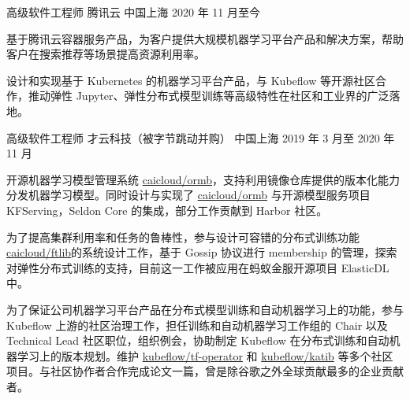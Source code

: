 

\begin{cventries}

  \cventry
    {高级软件工程师} %
    {腾讯云} %
    {中国上海} %
    {2020 年 11 月至今} %
    {
      \begin{cvitems}
        \item 基于腾讯云容器服务产品，为客户提供大规模机器学习平台产品和解决方案，帮助客户在搜索推荐等场景提高资源利用率。
        \item 设计和实现基于 Kubernetes 的机器学习平台产品，与 Kubeflow 等开源社区合作，推动弹性 Jupyter、弹性分布式模型训练等高级特性在社区和工业界的广泛落地。
      \end{cvitems}
    }

  \cventry
    {高级软件工程师} %
    {才云科技（被字节跳动并购）} %
    {中国上海} %
    {2019 年 3 月至 2020 年 11 月} %
    {
      \begin{cvitems} %
        \item 开源机器学习模型管理系统 \href{https://github.com/caicloud/ormb}{caicloud/ormb}，支持利用镜像仓库提供的版本化能力分发机器学习模型。同时设计与实现了 \href{https://github.com/caicloud/ormb}{caicloud/ormb} 与开源模型服务项目 KFServing，Seldon Core 的集成，部分工作贡献到 Harbor 社区。
        \item 为了提高集群利用率和任务的鲁棒性，参与设计可容错的分布式训练功能 \href{https://github.com/caicloud/ftlib}{caicloud/ftlib}的系统设计工作，基于 Gossip 协议进行 membership 的管理，探索对弹性分布式训练的支持，目前这一工作被应用在蚂蚁金服开源项目 ElasticDL 中。
        \item 为了保证公司机器学习平台产品在分布式模型训练和自动机器学习上的功能，参与 Kubeflow 上游的社区治理工作，担任训练和自动机器学习工作组的 Chair 以及 Technical Lead 社区职位，组织例会，协助制定 Kubeflow 在分布式训练和自动机器学习上的版本规划。维护 \href{https://github.com/kubeflow/tf-operator}{kubeflow/tf-operator} 和 \href{https://github.com/kubeflow/katib}{kubeflow/katib} 等多个社区项目。与社区协作者合作完成论文一篇，曾是除谷歌之外全球贡献最多的企业贡献者。
      \end{cvitems}
    }


\end{cventries}
